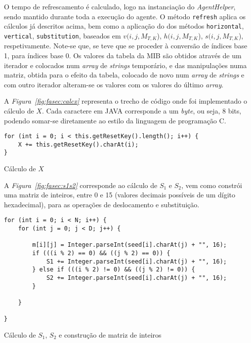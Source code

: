 O tempo de refrescamento é calculado, logo na instanciação do
\emph{AgentHelper}, sendo mantido durante toda a execução do agente. O método
\texttt{refresh} aplica os cálculos já descritos acima, bem como a aplicação do
dos métodos \texttt{horizontal}, \texttt{vertical}, \texttt{substitution},
baseados em $v(i, j, M_{T,K}$), $h(i, j, M_{T,K}$), $s(i, j, M_{T,K}$),
respetivamente. Note-se que, se teve que se proceder à conversão de índices base
1, para índices base 0. Os valores da tabela da MIB são obtidos através de um
iterador e colocados num \emph{array} de \emph{strings} temporário, e das
manipulações numa matriz, obtida para o efeito da tabela, colocado de novo num
\emph{array} de \emph{strings} e com outro iterador alteram-se os valores com
os valores do último \emph{array}. 

\newpage

A \emph{Figura~\ref{fig:fasec:calcx}} representa o trecho de código onde foi
implementado o cálculo de $X$. Cada caractere em JAVA corresponde a um
\emph{byte}, ou seja, 8 bits, podendo somar-se diretamente ao estilo da
linguagem de programação C. 

\begin{center}
\begin{verbatim}
for (int i = 0; i < this.getResetKey().length(); i++) {
	X += this.getResetKey().charAt(i);
}
\end{verbatim}
 	\captionsetup{type=figure, width=0.8\linewidth}
	\caption{Cálculo de $X$}
\label{fig:fasec:calcx} 
\end{center}


A \emph{Figura~\ref{fig:fasec:s1s2}} corresponde ao cálculo de $S_1$ e $S_2$,
vem como constrói uma matriz de inteiros, entre 0 e 15 (valores decimais
possíveis de um dígito hexadecimal), para as operações de deslocamento
e substituição.

\begin{center}
\begin{verbatim}
for (int i = 0; i < N; i++) {
	for (int j = 0; j < D; j++) {

		m[i][j] = Integer.parseInt(seed[i].charAt(j) + "", 16);
		if (((i % 2) == 0) && ((j % 2) == 0)) {
			S1 += Integer.parseInt(seed[i].charAt(j) + "", 16);
		} else if (((i % 2) != 0) && ((j % 2) != 0)) {
			S2 += Integer.parseInt(seed[i].charAt(j) + "", 16);
		}

	}

}

\end{verbatim}
 	\captionsetup{type=figure, width=0.8\linewidth}
	\caption{Cálculo de $S_1$, $S_2$ e construção de matriz de inteiros}
\label{fig:fasec:s1s2} 
\end{center}

